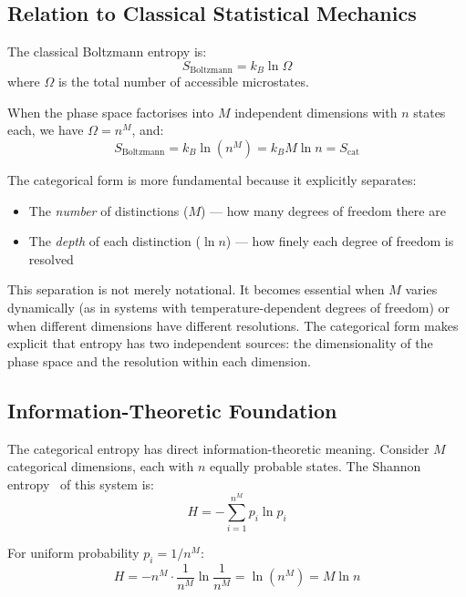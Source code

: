 \subsection{Relation to Classical Statistical Mechanics}

The classical Boltzmann entropy is:
\begin{equation}
S_{\text{Boltzmann}} = k_B \ln \Omega
\end{equation}
where $\Omega$ is the total number of accessible microstates.

When the phase space factorises into $M$ independent dimensions with $n$ states each, we have $\Omega = n^M$, and:
\begin{equation}
S_{\text{Boltzmann}} = k_B \ln(n^M) = k_B M \ln n = S_{\text{cat}}
\end{equation}

The categorical form is more fundamental because it explicitly separates:
\begin{itemize}
\item The \textit{number} of distinctions ($M$) — how many degrees of freedom there are
\item The \textit{depth} of each distinction ($\ln n$) — how finely each degree of freedom is resolved
\end{itemize}

This separation is not merely notational. It becomes essential when $M$ varies dynamically (as in systems with temperature-dependent degrees of freedom) or when different dimensions have different resolutions. The categorical form makes explicit that entropy has two independent sources: the dimensionality of the phase space and the resolution within each dimension.

\subsection{Information-Theoretic Foundation}

The categorical entropy has direct information-theoretic meaning. Consider $M$ categorical dimensions, each with $n$ equally probable states. The Shannon entropy~\cite{shannon1948} of this system is:
\begin{equation}
H = -\sum_{i=1}^{n^M} p_i \ln p_i
\end{equation}

For uniform probability $p_i = 1/n^M$:
\begin{equation}
H = -n^M \cdot \frac{1}{n^M} \ln\frac{1}{n^M} = \ln(n^M) = M \ln n
\end{equation}

